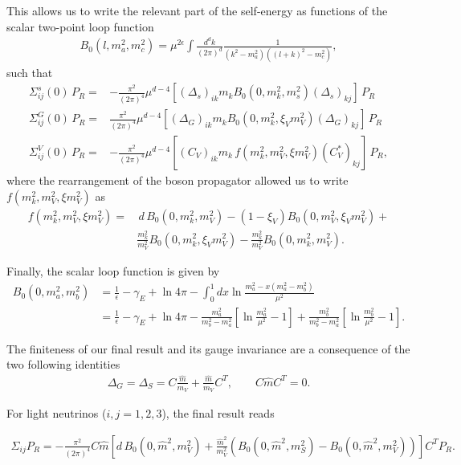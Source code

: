 This allows us to write the relevant part of the self-energy as functions of the scalar two-point loop function
\begin{align}
 B_0 (l, m_a^2,m_c^2) = \mu^{2\epsilon} \int \frac{d^d k}{(2 \pi)^d} \frac{1}{(k^2-m_a^2)( (l+k)^2 - m_c^2 )},
\end{align}
such that
\begin{align}
  \Sigma^s_{ij} (0) \, P_R =& -\frac{\pi^2}{(2\pi)^4} \mu^{d-4} \left[ (\Delta_s)_{ik} m_k B_0 (0,m_k^2, m_s^2) (\Delta_s)_{kj}\right] \, P_R \\
%
 \Sigma^G_{ij} (0) \, P_R =& \frac{\pi^2}{(2\pi)^4} \mu^{d-4} \left[ (\Delta_G)_{ik} m_k B_0 (0,m_k^2, \xi_V m_V^2) (\Delta_G)_{kj}\right] \, P_R \\
%
 \Sigma^V_{ij} (0) \, P_R =& -\frac{\pi^2}{(2 \pi)^4} \mu^{d-4} \left[ (C_V)_{ik} m_k \,f( m_k^2, m_V^2, \xi m_V^2) (C_V^*)_{kj} \right] \, P_R,
\end{align}
where the rearrangement of the boson propagator allowed us to write $f( m_k^2, m_V^2, \xi m_V^2)$ as
\begin{align*}
f( m_k^2, m_V^2, \xi m_V^2) =&\, d\, B_0(0,m_k^2, m_V^2) - (1-\xi_V) B_0 (0,m_V^2, \xi_V m_V^2) +\\ & \frac{m_k^2}{m_V^2} B_0 (0, m_k^2, \xi_V m_V^2) - \frac{m_k^2}{m_V^2} B_0 (0,  m_k^2, m_V^2). 
\end{align*}

Finally, the scalar loop function is given by
\begin{align*}
 B_0 (0,m_a^2,m_b^2) &= \frac{1}{\epsilon} - \gamma_E + \ln{4 \pi} - \int_0^1 dx \ln{\frac{m_a^2-x(m_a^2 - m_b^2)}{\mu^2}}\\
 &= \frac{1}{\epsilon} - \gamma_E + \ln{4 \pi} - \frac{m_a^2}{m_b^2 - m_a^2} \left[ \ln{\frac{m_a^2}{\mu^2}}  - 1 \right] + \frac{m_b^2}{m_b^2 - m_a^2} \left[ \ln{\frac{m_b^2}{\mu^2}}  - 1 \right].
\end{align*}

The finiteness of our final result and its gauge invariance are a consequence of the two following identities
\begin{align}
 \Delta_G = \Delta_S = C \frac{\hat{m}}{m_V} + \frac{\hat{m}}{m_V}C^T, \quad \quad C \hat{m} C^T = 0.
\end{align}

For light neutrinos ($i,j=1,2,3$), the final result reads

\begin{align}
 \Sigma_{ij} P_R  = -\frac{\pi^2}{(2\pi)^4} C \hat{m}\left[ d\, B_0(0,\hat{m}^2,m_V^2) + \frac{\hat{m}^2}{m_V^2} \left( B_0 (0,\hat{m}^2,m_S^2) - B_0(0,\hat{m}^2,m_V^2) \right) \right] C^T P_R.
\end{align}

